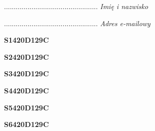 \begin{turn}{90}\begin{minipage}{\linewidth} \vspace{20mm} ................................................  \textit{Imię i nazwisko}\end{minipage}\end{turn}

\begin{turn}{90}\begin{minipage}{\linewidth} \vspace{20mm} ................................................  \textit{Adres e-mailowy}\end{minipage}\end{turn}

\begin{turn}{90}\huge \begin{minipage}{\linewidth} \vspace{10mm}\textbf{S1420D129C}\end{minipage}\end{turn}

\begin{turn}{90}\huge \begin{minipage}{\linewidth} \vspace{10mm}\textbf{S2420D129C}\end{minipage}\end{turn}

\begin{turn}{90}\huge \begin{minipage}{\linewidth} \vspace{10mm}\textbf{S3420D129C}\end{minipage}\end{turn}

\begin{turn}{90}\huge \begin{minipage}{\linewidth} \vspace{10mm}\textbf{S4420D129C}\end{minipage}\end{turn}

\begin{turn}{90}\huge \begin{minipage}{\linewidth} \vspace{10mm}\textbf{S5420D129C}\end{minipage}\end{turn}

\begin{turn}{90}\huge \begin{minipage}{\linewidth} \vspace{10mm}\textbf{S6420D129C}\end{minipage}\end{turn}

